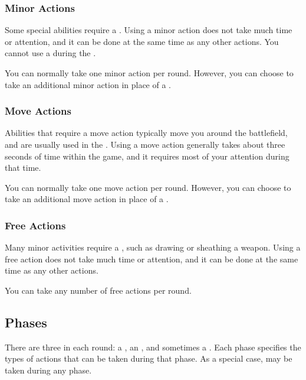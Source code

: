         \subsubsection{Minor Actions}\label{Minor Actions}
            Some special abilities require a .
            Using a minor action does not take much time or attention, and it can be done at the same time as any other actions.
            You cannot use a  during the .

            You can normally take one minor action per round.
            However, you can choose to take an additional minor action in place of a .

        \subsubsection{Move Actions}\label{Move Actions}
            Abilities that require a move action typically move you around the battlefield, and are usually used in the .
            Using a move action generally takes about three seconds of time within the game, and it requires most of your attention during that time.

            You can normally take one move action per round.
            However, you can choose to take an additional move action in place of a .

        \subsubsection{Free Actions}\label{Free Actions}
            Many minor activities require a , such as drawing or sheathing a weapon.
            Using a free action does not take much time or attention, and it can be done at the same time as any other actions.

            You can take any number of free actions per round.

    \subsection{Phases}\label{Phases}

        There are three  in each round: a , an , and sometimes a .
        Each phase specifies the types of actions that can be taken during that phase.
        As a special case,  may be taken during any phase.


